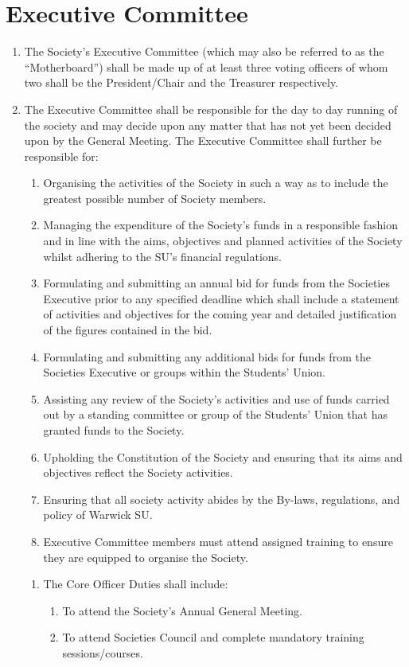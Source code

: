 \documentclass[a4paper,11pt,parskip=half-]{scrartcl} %
\begin{document}
\section{Executive Committee}
\begin{enumerate}
    \item The Society's Executive Committee (which may also be referred to as the ``Motherboard'') shall be made up of at least three voting officers of whom two shall be the President/Chair and the Treasurer respectively.
    \item The Executive Committee shall be responsible for the day to day running of the society and may decide upon any matter that has not yet been decided upon by the General Meeting. The Executive Committee shall further be responsible for:
    \begin{enumerate}
        \item Organising the activities of the Society in such a way as to include the greatest possible number of Society members.
        \item Managing the expenditure of the Society's funds in a responsible fashion and in line with the aims, objectives and planned activities of the Society whilst adhering to the SU's financial regulations.
        \item Formulating and submitting an annual bid for funds from the Societies Executive prior to any specified deadline which shall include a statement of activities and objectives for the coming year and detailed justification of the figures contained in the bid.
        \item Formulating and submitting any additional bids for funds from the Societies Executive or groups within the Students' Union.
        \item Assisting any review of the Society's activities and use of funds carried out by a standing committee or group of the Students' Union that has granted funds to the Society.
        \item Upholding the Constitution of the Society and ensuring that its aims and objectives reflect the Society activities.
        \item Ensuring that all society activity abides by the By-laws, regulations, and policy of Warwick SU.
        \item Executive Committee members must attend assigned training to ensure they are equipped to organise the Society.
    \end{enumerate}

    \begin{enumerate}[series=core]
        \item The Core Officer Duties shall include:
        \begin{enumerate}
            \item To attend the Society's Annual General Meeting.
            \item To attend Societies Council and complete mandatory training sessions/courses.
        \end{enumerate}
    \end{enumerate}
\end{enumerate}
\end{document}
